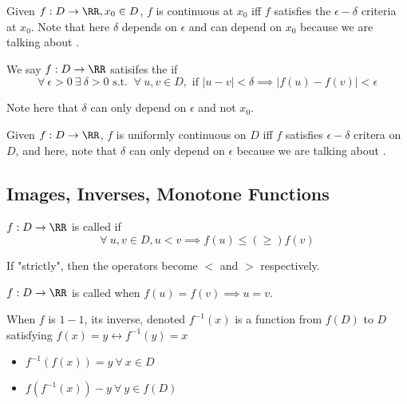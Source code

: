 \documentclass[12pt]{scrartcl}
\begin{document}
\begin{theorem}
  Given $f: D \to \RR, x_0 \in D$, $f$ is continuous at $x_0$ iff $f$ satisfies the 
  $\epsilon-\delta$ criteria at $x_0$. Note that here $\delta$ depends on 
  $\epsilon$ and can depend on $x_0$ because we are talking about .
\end{theorem}

\begin{definition}
  We say $f: D \to \RR$ satisifes the  if 
  \[\forall \ \epsilon > 0 \ \exists \ \delta > 0 \text{ s.t. } \ \forall \ u, v \in D, \text{ if } |u-v| < \delta \implies |f(u) - f(v)| < \epsilon\]

  Note here that $\delta$ can only depend on $\epsilon$ and not $x_0$. 

\end{definition}

\begin{theorem}
  Given $f: D \to \RR$, $f$ is uniformly continuous on $D$ iff $f$ satisfies 
  $\epsilon-\delta$ critera on $D$, and here, note that $\delta$ can only depend on 
  $\epsilon$ because we are talking about .
\end{theorem}

\subsection{Images, Inverses, Monotone Functions}

\begin{definition}
  $f: D \to \RR$ is called  if
  \[\forall \ u, v \in D, u < v \implies f(u) \leq (\geq) f(v)\]

  If "strictly", then the operators become $<$ and $>$ respectively. 
\end{definition}

\begin{definition}
  $f: D \to \RR$ is called  when $f(u) = f(v) \implies u = v$. 
\end{definition}

\begin{definition}
  When $f$ is $1-1$, its inverse, denoted $f^{-1}(x)$ is a function from 
  $f(D)$ to $D$ satisfying $f(x) = y \leftrightarrow f^{-1}(y) = x$

  \begin{itemize}
    \item $f^{-1}(f(x)) = y \ \forall \ x \in D$
    \item $f(f^{-1}(x)) - y \ \forall \ y \in f(D)$
  \end{itemize}

\end{definition}
\end{document}

